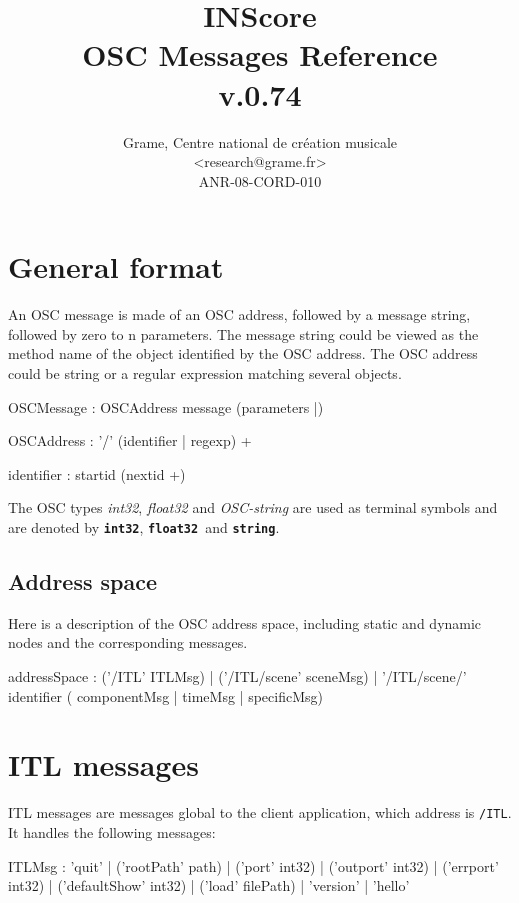 \documentclass[a4paper,twoside]{report}
\newcommand{\toplevel}[1]	{\chapter{#1}}
\newcommand{\sublevel}[1]	{\section{#1}}
\newcommand{\OSC}[1]		{\texttt{#1}}
\newcommand{\osctype}[1]{\textbf{\texttt{{\small #1}}}}
\newcommand{\oscint}{\osctype{int32}}
\newcommand{\oscfloat}{\osctype{float32}}
\newcommand{\oscstring}{\osctype{string}}
\begin{document}
\title{INScore \\ OSC Messages Reference \\v.0.74}

\author{Grame, Centre national de cr\'eation musicale\\
{\small <research@grame.fr>} \\
\vspace{2mm}
ANR-08-CORD-010
}

\maketitle

\pagestyle{empty}
\cleardoublepage
\tableofcontents
\newpage
\pagestyle{plain}
\setcounter{page}{1}

\toplevel{General format}
\label{genformat}
An OSC message is made of an OSC address, followed by a message string, followed by zero to n parameters. The message string could be viewed as the method name of the object identified by the OSC address.
The OSC address could be string or a regular expression matching several objects.
\begin{rail}
OSCMessage : OSCAddress message (parameters |)
\end{rail}

\begin{rail}
OSCAddress : '/' (identifier | regexp) +
\end{rail}

\railalias{nextid}{[-\_a-zA-Z0-9]]}
\begin{rail}
identifier : startid (nextid +)
\end{rail}

The OSC types \emph{int32}, \emph{float32} and \emph{OSC-string} are used as terminal symbols and are denoted by \oscint, \oscfloat\ and \oscstring. 

\sublevel{Address space}
Here is a description of the OSC address space, including static and dynamic nodes and the corresponding messages.
\begin{rail}
addressSpace : ('/ITL' ITLMsg) 
			| ('/ITL/scene' sceneMsg) 
			| '/ITL/scene/' identifier ( componentMsg | timeMsg | specificMsg)
\end{rail}


\toplevel{ITL messages}
\label{ITL}
ITL messages are messages global to the client application, which address is \OSC{/ITL}. It handles the following messages:
\begin{rail}
ITLMsg : 'quit' 
		| ('rootPath' path) 
		| ('port' int32)
		| ('outport' int32)
		| ('errport' int32)
		| ('defaultShow' int32)
		| ('load' filePath)
		| 'version'
		| 'hello'
\end{rail}
\end{document}
